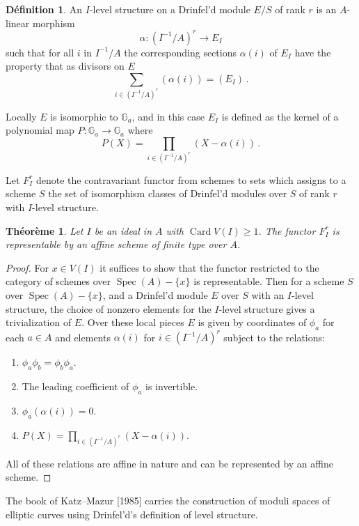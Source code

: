 \documentclass[12pt,a4paper]{article}
\theoremstyle{plain}
\newtheorem{theorem}{Th\'eor\`eme}[section]
\theoremstyle{definition}
\newtheorem{definition}{D\'efinition}[section]
\theoremstyle{remark}
\DeclareMathOperator{\Spec}{Spec}
\DeclareMathOperator{\Card}{Card}
\begin{document}
\begin{definition}
An $I$-level structure on a Drinfel'd module $E/S$ of rank $r$ is an 
$A$-linear morphism
\[
\alpha\colon (I^{-1}/A)^r \longrightarrow E_I
\]
such that for all $i$ in $I^{-1}/A$ the corresponding sections $\alpha(i)$ of 
$E_I$ have the property that as divisors on $E$
\[
\sum_{i \in (I^{-1}/A)^r} (\alpha(i)) = (E_I) \,.
\]
\end{definition}

Locally $E$ is isomorphic to $\mathbb{G}_a$, and in this case $E_I$ is 
defined as the kernel of a polynomial map $P\colon \mathbb{G}_a \to \mathbb{G}_a$ 
where
\[
P(X) = \prod_{i \in (I^{-1}/A)^r} (X - \alpha(i)) \,.
\]

Let $F_I^r$ denote the contravariant functor from schemes to sets which assigns 
to a scheme $S$ the set of isomorphism classes of Drinfel'd modules over $S$ of 
rank $r$ with $I$-level structure.

\begin{theorem}
Let $I$ be an ideal in $A$ with $\Card V(I) \geqslant 1$. The functor $F_I^r$ 
is representable by an affine scheme of finite type over $A$.
\end{theorem}

\begin{proof}
For $x \in V(I)$ it suffices to show that the functor restricted to the 
category of schemes over $\Spec(A) - \{x\}$ is representable. Then for a 
scheme $S$ over $\Spec(A) - \{x\}$, and a Drinfel'd module $E$ over $S$ with 
an $I$-level structure, the choice of nonzero elements for the $I$-level 
structure gives a trivialization of $E$. Over these local pieces $E$ is given 
by coordinates of $\phi_a$ for each $a \in A$ and elements $\alpha(i)$ for 
$i \in (I^{-1}/A)^r$ subject to the relations:
\begin{enumerate}[label=(\alph*)]
\item $\phi_a \phi_b = \phi_b \phi_a$.
\item The leading coefficient of $\phi_a$ is invertible.
\item $\phi_a(\alpha(i)) = 0$.
\item $P(X) = \prod_{i \in (I^{-1}/A)^r} (X - \alpha(i))$.
\end{enumerate}
All of these relations are affine in nature and can be represented by an 
affine scheme.
\end{proof}

The book of Katz--Mazur [1985] carries the construction of moduli spaces of 
elliptic curves using Drinfel'd's definition of level structure.
\end{document}

